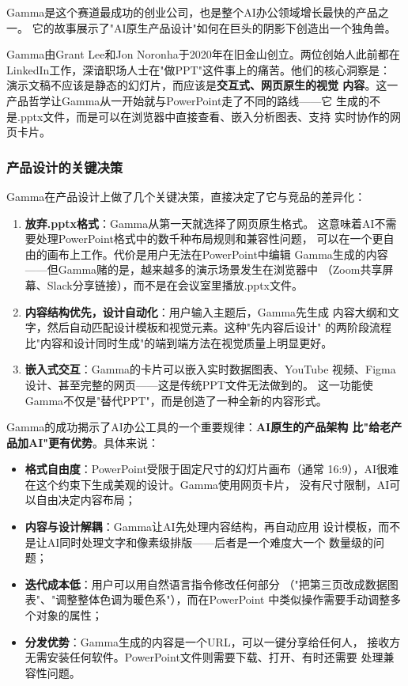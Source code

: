 Gamma是这个赛道最成功的创业公司，也是整个AI办公领域增长最快的产品之一。
它的故事展示了"AI原生产品设计"如何在巨头的阴影下创造出一个独角兽。

Gamma由Grant Lee和Jon Noronha于2020年在旧金山创立。两位创始人此前都在
LinkedIn工作，深谙职场人士在"做PPT"这件事上的痛苦。他们的核心洞察是：
演示文稿不应该是静态的幻灯片，而应该是\textbf{交互式、网页原生的视觉
内容}。这一产品哲学让Gamma从一开始就与PowerPoint走了不同的路线——它
生成的不是.pptx文件，而是可以在浏览器中直接查看、嵌入分析图表、支持
实时协作的网页卡片。

\subsubsection{产品设计的关键决策}
Gamma在产品设计上做了几个关键决策，直接决定了它与竞品的差异化：

\begin{enumerate}
  \item \textbf{放弃.pptx格式}：Gamma从第一天就选择了网页原生格式。
    这意味着AI不需要处理PowerPoint格式中的数千种布局规则和兼容性问题，
    可以在一个更自由的画布上工作。代价是用户无法在PowerPoint中编辑
    Gamma生成的内容——但Gamma赌的是，越来越多的演示场景发生在浏览器中
    （Zoom共享屏幕、Slack分享链接），而不是在会议室里播放.pptx文件。
  \item \textbf{内容结构优先，设计自动化}：用户输入主题后，Gamma先生成
    内容大纲和文字，然后自动匹配设计模板和视觉元素。这种"先内容后设计"
    的两阶段流程比"内容和设计同时生成"的端到端方法在视觉质量上明显更好。
  \item \textbf{嵌入式交互}：Gamma的卡片可以嵌入实时数据图表、YouTube
    视频、Figma设计、甚至完整的网页——这是传统PPT文件无法做到的。
    这一功能使Gamma不仅是"替代PPT"，而是创造了一种全新的内容形式。
\end{enumerate}

\begin{whybox}[为什么Gamma能跑赢微软Copilot？]
Gamma的成功揭示了AI办公工具的一个重要规律：\textbf{AI原生的产品架构
比"给老产品加AI"更有优势}。具体来说：
\begin{itemize}
  \item \textbf{格式自由度}：PowerPoint受限于固定尺寸的幻灯片画布（通常
    16:9），AI很难在这个约束下生成美观的设计。Gamma使用网页卡片，
    没有尺寸限制，AI可以自由决定内容布局；
  \item \textbf{内容与设计解耦}：Gamma让AI先处理内容结构，再自动应用
    设计模板，而不是让AI同时处理文字和像素级排版——后者是一个难度大一个
    数量级的问题；
  \item \textbf{迭代成本低}：用户可以用自然语言指令修改任何部分
    （"把第三页改成数据图表"、"调整整体色调为暖色系"），而在PowerPoint
    中类似操作需要手动调整多个对象的属性；
  \item \textbf{分发优势}：Gamma生成的内容是一个URL，可以一键分享给任何人，
    接收方无需安装任何软件。PowerPoint文件则需要下载、打开、有时还需要
    处理兼容性问题。
\end{itemize}
\end{whybox}

